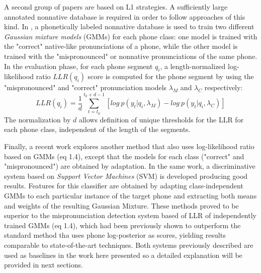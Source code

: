 A second group of papers are based on L1 strategies. A sufficiently large annotated nonnative
database is required in order to follow approaches of this kind.
In \cite{detection_phone_level_mispronunciation_learning}, a phonetically labeled nonnative
database is used to train two different \textit{Gaussian mixture models} (GMMs) for each phone
class: one model is trained with the "correct" native-like pronunciations of a phone, while the
other model is trained with the "mispronounced" or nonnative pronunciations of the same phone.
In the evaluation phase, for each phone segment $q_{i}$, a length-normalized log-likelihood ratio
$LLR(q_{i})$ score is computed for the phone segment by using the "mispronounced" and "correct"
pronunciation models $\lambda_{M}$ and $\lambda_{C}$ respectively:
\begin{equation}
LLR(q_{i}) = \frac{1}{d}\sum_{t=t_{0}}^{t_{0}+d-1} [log \ p(y_{t}|q_{i}, \lambda_{M}) - log \ p(y_{t}|q_{i}, \lambda_{C})]
\end{equation}
The normalization by $d$ allows definition of unique thresholds for the LLR for each phone class, 
independent of the length of the segments.

Finally, a recent work \cite{main} explores another method that also uses 
log-likelihood ratio based on  GMMs (eq 1.4), except that the models for each 
class ("correct" and  "mispronounced") are obtained by adaptation. In the same work, 
a discriminative system based
on \textit{Support Vector Machines} (SVM) is developed producing good results. Features 
for this classifier are obtained by adapting class-independent GMMs to each particular 
instance of the target phone and extracting both means and weights of the resulting 
Gaussian Mixture.
These methods proved to be superior to the mispronunciation detection system based of 
LLR of independently trained GMMs (eq 1.4), which had been previously shown to 
outperform the standard method tha uses phone log-posterior as scores, yielding
results comparable to state-of-the-art techniques.
Both systems previously described are used as baselines in the work here 
presented so a detailed explanation will be provided in next sections.
